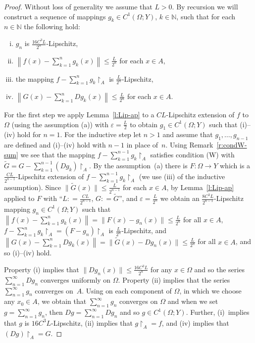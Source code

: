 \documentclass[a4paper,twoside,10pt,reqno,draft]{amsart}
\let\wtilde=\widetilde
\theoremstyle{definition}
\theoremstyle{remark}
\newcommand\norm[1]{\mathopen\|#1\mathclose\|}
\newcommand\norma[1]{\left\|#1\right\|}
\newcommand\ve{\varepsilon}
\newcommand\Om{\Omega}
\newcommand\N{{\mathbb N}}
\newcommand\restr[1]{\mathclose\restriction_{#1}}
\newcommand\eqdef{\mathrel{\mathop:}=}
\newcommand\cW{(W)}
\begin{document}
\begin{proof}
Without loss of generality we assume that $L>0$.
By recursion we will construct a sequence of mappings $g_k\in C^1(\Om;Y)$, $k\in\N$, such that for each $n\in\N$ the following hold:
\begin{enumerate}[(i)]
\item $g_n$ is $\frac{16C^3L}{2^n}$-Lipschitz,
\item $\norma{f(x)-\sum_{k=1}^ng_k(x)}\le\frac L{2^n}$ for each $x\in A$,
\item the mapping $f-\sum_{k=1}^ng_k\restr A$ is $\frac L{2^n}$-Lipschitz,
\item $\norma{G(x)-\sum_{k=1}^nDg_k(x)}\le\frac L{2^n}$ for each $x\in A$.
\end{enumerate}
For the first step we apply Lemma~\ref{l:Lip-ap} to a $CL$-Lipschitz extension of $f$ to $\Om$ (using the assumption (a)) with $\ve=\frac L2$ to obtain $g_1\in C^1(\Om;Y)$ such that (i)--(iv) hold for $n=1$.
For the inductive step let $n>1$ and assume that $g_1,\dotsc,g_{n-1}$ are defined and (i)--(iv) hold with $n-1$ in place of~$n$.
Using Remark~\ref{r:condW-sum} we see that the mapping $f-\sum_{k=1}^{n-1}g_k\restr A$ satisfies condition {\cW} with $\wtilde G=G-\sum_{k=1}^{n-1}(Dg_k)\restr A$.
By the assumption~(a) there is $F\colon\Om\to Y$ which is a $\frac{CL}{2^{n-1}}$-Lipschitz extension of $f-\sum_{k=1}^{n-1}g_k\restr A$ (we use (iii) of the inductive assumption).
Since $\norm{\wtilde G(x)}\le\frac L{2^{n-1}}$ for each $x\in A$, by Lemma~\ref{l:Lip-ap} applied to $F$ with ``$L\eqdef\frac{CL}{2^{n-1}}$, $G\eqdef\wtilde G$'', and $\ve=\frac L{2^n}$
we obtain an $\frac{8C^3L}{2^{n-1}}$-Lipschitz mapping $g_n\in C^1(\Om;Y)$ such that $\norma{f(x)-\sum_{k=1}^ng_k(x)}=\norm{F(x)-g_n(x)}\le\frac L{2^n}$ for all $x\in A$,
$f-\sum_{k=1}^ng_k\restr A=(F-g_n)\restr A$ is $\frac L{2^n}$-Lipschitz,
and $\norma{G(x)-\sum_{k=1}^nDg_k(x)}=\norm{\wtilde G(x)-Dg_n(x)}\le\frac L{2^n}$ for all $x\in A$, and so (i)--(iv) hold.

Property (i) implies that $\norm{Dg_n(x)}\le\frac{16C^3L}{2^n}$ for any $x\in\Om$ and so the series $\sum_{n=1}^\infty Dg_n$ converges uniformly on $\Om$.
Property (ii) implies that the series $\sum_{n=1}^\infty g_n$ converges on~$A$.
Using \cite[(8.6.5)]{Die} on each component of $\Om$, in which we choose any $x_0\in A$, we obtain that $\sum_{n=1}^\infty g_n$ converges on $\Om$
and when we set $g=\sum_{n=1}^\infty g_n$, then $Dg=\sum_{n=1}^\infty Dg_n$ and so $g\in C^1(\Om;Y)$.
Further, (i)~implies that $g$ is $16C^3L$-Lipschitz, (ii) implies that $g\restr A=f$, and (iv) implies that $(Dg)\restr A=G$.
\end{proof}
\end{document}
